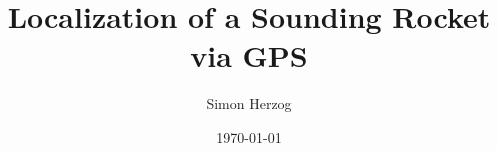 \documentclass[    
    paper=a4,
    twoside=false,
    12pt,
    pagesize=auto,
    parskip=half,
    headsepline=true,
    numbers=noenddot, %
    draft=false
]{report}
\title{Localization of a Sounding Rocket via GPS}
\author{Simon Herzog}
\date{\today}
\begin{document}
 
 \setcounter{page}{1}
 
  

 
 
 
 
 \tableofcontents
 
 \newpage
 
 \setcounter{page}{1}

 

 
 
 
 
 
 
 
 
 
 
 
 
 
 
 \begin{appendices}
  
  
  
 \end{appendices}
 
\end{document}
